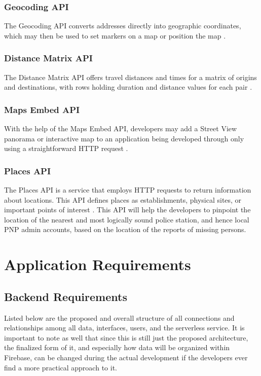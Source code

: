 \subsubsection{Geocoding API}
The Geocoding API converts addresses directly into geographic coordinates, which may then be used to set markers on a map or position the map  \cite{geocoding}.

\subsubsection{Distance Matrix API}
The Distance Matrix API offers travel distances and times for a matrix of origins and destinations, with rows holding duration and distance values for each pair \cite{distanceMatrix}.

\subsubsection{Maps Embed API}
With the help of the Maps Embed API, developers may add a Street View panorama or interactive map to an application being developed through only using a straightforward HTTP request \cite{mapsEmbed}.

\subsubsection{Places API}
The Places API is a service that employs HTTP requests to return information about locations. This API defines places as establishments, physical sites, or important points of interest \cite{placesAPI}. This API will help the developers to pinpoint the location of the nearest and most logically sound police station, and hence local PNP admin accounts, based on the location of the reports of missing persons.

\section{Application Requirements}
\subsection{Backend Requirements}
Listed below are the proposed and overall structure of all connections and relationships among all data, interfaces, users, and the serverless service. It is important to note as well that since this is still just the proposed architecture, the finalized form of it, and especially how data will be organized within Firebase, can be changed during the actual development if the developers ever find a more practical approach to it.

